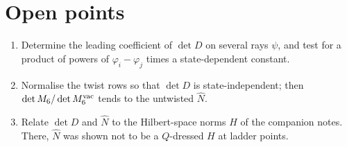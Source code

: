 \documentclass[11pt]{article}
\begin{document}
\section{Open points}
\begin{enumerate}
\item Determine the leading coefficient of $\det D$ on several rays $\psi$, and test for a product
of powers of $\varphi_i-\varphi_j$ times a state-dependent constant.
\item Normalise the twist rows so that $\det D$ is state-independent; then
$\det M_6/\det M_6^{\rm vac}$ tends to the untwisted $\widehat N$.
\item Relate $\det D$ and $\widehat N$ to the Hilbert-space norms $H$ of the companion notes. There,
$\widehat N$ was shown not to be a $Q$-dressed $H$ at ladder points.
\end{enumerate}
\end{document}

